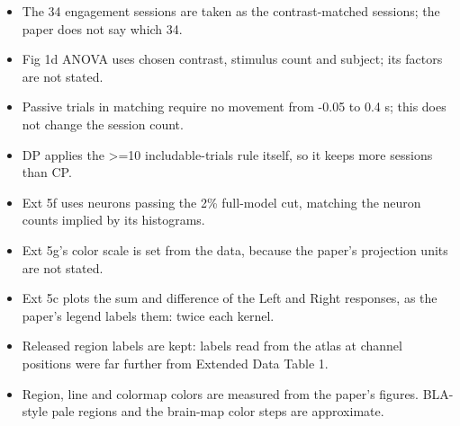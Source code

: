 \begin{itemize}
\item The 34 engagement sessions are taken as the contrast-matched sessions; the paper does not say which 34.
\item Fig 1d ANOVA uses chosen contrast, stimulus count and subject; its factors are not stated.
\item Passive trials in matching require no movement from -0.05 to 0.4 s; this does not change the session count.
\item DP applies the >=10 includable-trials rule itself, so it keeps more sessions than CP.
\item Ext 5f uses neurons passing the 2\% full-model cut, matching the neuron counts implied by its histograms.
\item Ext 5g's color scale is set from the data, because the paper's projection units are not stated.
\item Ext 5c plots the sum and difference of the Left and Right responses, as the paper's legend labels them: twice each kernel.
\item Released region labels are kept: labels read from the atlas at channel positions were far further from Extended Data Table 1.
\item Region, line and colormap colors are measured from the paper's figures. BLA-style pale regions and the brain-map color steps are approximate.
\end{itemize}
